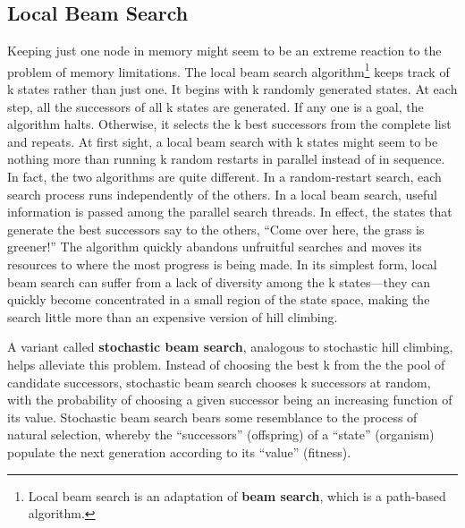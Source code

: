 \subsection{Local Beam Search}
Keeping just one node in memory might seem to be an extreme reaction to the problem of
memory limitations. The local beam search algorithm\footnote{Local beam search is an adaptation of \textbf{beam search}, which is a path-based algorithm.} keeps track of k states rather than just one. It begins with k randomly generated states. At each step, all the successors of all k states are generated. If any one is a goal, the algorithm halts. Otherwise, it selects the k best successors from the complete list and repeats.
At first sight, a local beam search with k states might seem to be nothing more than running k random restarts in parallel instead of in sequence. In fact, the two algorithms are quite different. In a random-restart search, each search process runs independently of the others. In a local beam search, useful information is passed among the parallel search threads. In effect, the states that generate the best successors say to the others, “Come over here, the grass is greener!” The algorithm quickly abandons unfruitful searches and moves its resources to where the most progress is being made. In its simplest form, local beam search can suffer from a lack of diversity among the k states—they can quickly become concentrated in a small region of the state space, making the search little more than an expensive version of hill climbing. 

A variant called \textbf{stochastic beam search}, analogous to stochastic hill climbing, helps alleviate this problem. Instead of choosing the best k from the the pool of candidate successors, stochastic beam search chooses k successors at random, with the probability of choosing a given successor being an increasing function of its value. Stochastic beam search bears some resemblance to the process of natural selection, whereby the “successors” (offspring) of a “state” (organism) populate the next generation according to its “value” (fitness).


